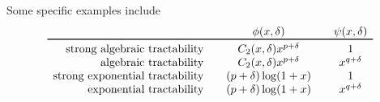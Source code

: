 \documentclass{article}
\theoremstyle{definition}
\begin{document}
Some specific examples include 
\begin{equation*}
    \begin{array}{r@{\qquad}c@{\qquad}c}
    & \phi(x,\delta) & \psi(x,\delta) \\
    \toprule
    \text{strong algebraic tractability} & C_2(x,\delta) x^{p+\delta} & 1\\
    \text{ algebraic tractability} & C_2(x,\delta) x^{p+\delta} & x^{q+\delta}\\
    \text{strong exponential tractability} &(p+\delta) \log(1 + x) & 1 \\
    \text{ exponential tractability} &(p+\delta) \log(1 + x) &  x^{q+\delta} \\
    & 
    \end{array}
\end{equation*}
\end{document}
